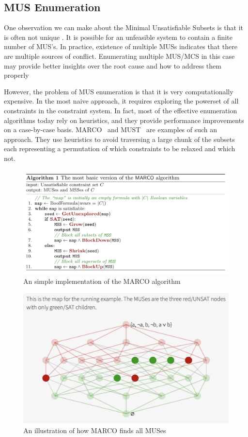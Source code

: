 \subsection{MUS Enumeration}
One observation we can make about the  Minimal Unsatisfiable Subsets is that it is often not unique . It is possible for an unfeasible system to contain a finite number of MUS’s. In practice, existence of multiple MUSs indicates that there are multiple sources of conflict. Enumerating multiple MUS/MCS in this case may provide better insights over the root cause and how to address them properly


However, the problem of MUS enumeration is that it is very computationally expensive. In the most naive approach, it requires exploring the powerset of all constraints in the constraint system. In fact, most of the effective enumeration algorithms today rely on heuristics, and they provide performance improvements on a case-by-case basis. MARCO~\cite{} and MUST~\cite{} are examples of such an approach. They use heuristics to avoid traversing a large chunk of the subsets each representing a permutation of which constraints to be relaxed and which not.


\begin{figure}[hbt]
  \includegraphics[width=\linewidth]{MarcoAlgo}
  \caption{An simple implementation of the MARCO algorithm}
\end{figure}


\begin{figure}[hbt]
  \includegraphics[width=\linewidth]{MarcoViz}
  \caption{An illustration of how MARCO finds all MUSes}
\end{figure}
  

